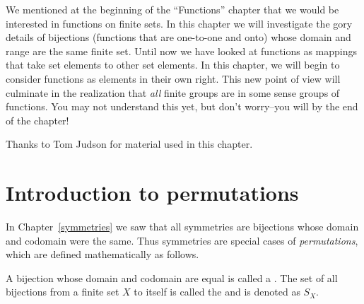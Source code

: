 We mentioned at the beginning of  the ``Functions'' chapter that we would be interested in functions on finite sets. In this chapter we will investigate the gory details of bijections (functions that are one-to-one and onto) whose domain and range are the same finite set. Until now we have looked at functions as  mappings that take set elements to other set elements. In this chapter, we will begin to consider functions as elements in their own right. This new point of view will culminate in the realization that \emph{all} finite groups are in some sense groups of functions. You may not understand this yet, but don't worry--you will by the end of the chapter!
\bigskip


Thanks to Tom Judson for material used in this chapter.

\section{Introduction to permutations}

In Chapter~\ref{symmetries} we saw that all symmetries are  bijections whose domain and codomain were the same.  Thus symmetries are special cases of \emph{permutations}, which are defined mathematically as follows.

\begin{defn}
A bijection whose domain and codomain are equal is called a . The set of all bijections from a finite set $X$ to itself is called the  and is denoted as $S_X$.
\end{defn}

